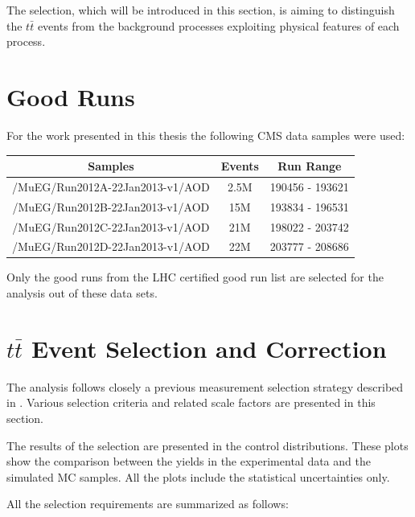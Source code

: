 The selection, which will be introduced in this section, is aiming to distinguish the $t\bar{t}$ events
from the background processes exploiting physical features of each process.

\section{Good Runs}

For the work presented in this thesis the following CMS data samples were used:

\begin{center}\label{tab:samples}
  \begin{tabular}{| c c c |}
    \hline
    \textbf{Samples} & \textbf{Events} & \textbf{Run Range} \\ \hline
    /MuEG/Run2012A-22Jan2013-v1/AOD & 2.5M & 190456 - 193621 \\ 
    /MuEG/Run2012B-22Jan2013-v1/AOD & 15M & 193834 - 196531 \\
    /MuEG/Run2012C-22Jan2013-v1/AOD & 21M & 198022 - 203742 \\
    /MuEG/Run2012D-22Jan2013-v1/AOD & 22M & 203777 -  208686 \\
    \hline
  \end{tabular}
\end{center}

Only the good runs from the LHC certified good run list\cite{JSON} are selected for the analysis out of these data sets.

\section{$t\bar{t}$ Event Selection and Correction}\label{sec:sel}

The analysis follows closely a previous measurement selection strategy described in \cite{Asin2014Auth}. Various selection criteria and related scale factors are presented in this section.

The results of the selection are presented in the control distributions. These plots show the comparison between the yields in the experimental data and the simulated MC samples.
All the plots include the statistical uncertainties only.

All the selection requirements are summarized as follows:

